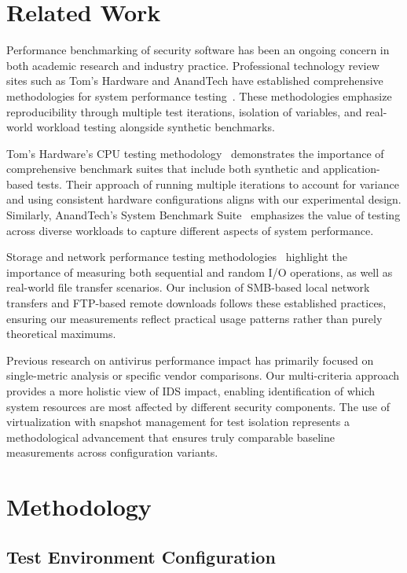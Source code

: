 \documentclass[runningheads,a4paper,english]{llncs}[2022/01/12]
\begin{document}
\section{Related Work}
\label{sec:relatedwork}

Performance benchmarking of security software has been an ongoing concern in both academic research and industry practice. Professional technology review sites such as Tom's Hardware and AnandTech have established comprehensive methodologies for system performance testing~\cite{TomsHardwareBenchmark, AnandTechBenchmark}. These methodologies emphasize reproducibility through multiple test iterations, isolation of variables, and real-world workload testing alongside synthetic benchmarks.

Tom's Hardware's CPU testing methodology~\cite{TomsHardwareBenchmark} demonstrates the importance of comprehensive benchmark suites that include both synthetic and application-based tests. Their approach of running multiple iterations to account for variance and using consistent hardware configurations aligns with our experimental design. Similarly, AnandTech's System Benchmark Suite~\cite{AnandTechBenchmark} emphasizes the value of testing across diverse workloads to capture different aspects of system performance.

Storage and network performance testing methodologies~\cite{TomsHardwareStorage} highlight the importance of measuring both sequential and random I/O operations, as well as real-world file transfer scenarios. Our inclusion of SMB-based local network transfers and FTP-based remote downloads follows these established practices, ensuring our measurements reflect practical usage patterns rather than purely theoretical maximums.

Previous research on antivirus performance impact has primarily focused on single-metric analysis or specific vendor comparisons. Our multi-criteria approach provides a more holistic view of IDS impact, enabling identification of which system resources are most affected by different security components. The use of virtualization with snapshot management for test isolation represents a methodological advancement that ensures truly comparable baseline measurements across configuration variants.

\section{Methodology}
\label{sec:methodology}

\subsection{Test Environment Configuration}
\end{document}
